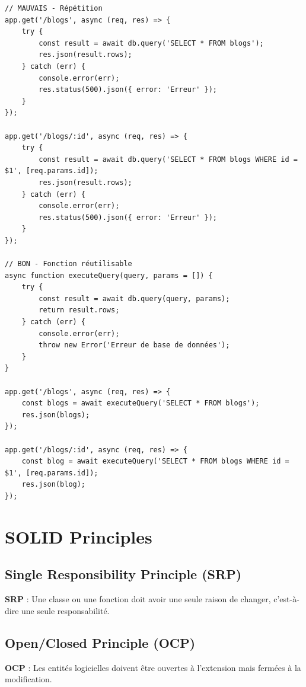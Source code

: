 \begin{lstlisting}[style=javascript, caption=Exemple DRY]
// MAUVAIS - Répétition
app.get('/blogs', async (req, res) => {
    try {
        const result = await db.query('SELECT * FROM blogs');
        res.json(result.rows);
    } catch (err) {
        console.error(err);
        res.status(500).json({ error: 'Erreur' });
    }
});

app.get('/blogs/:id', async (req, res) => {
    try {
        const result = await db.query('SELECT * FROM blogs WHERE id = $1', [req.params.id]);
        res.json(result.rows);
    } catch (err) {
        console.error(err);
        res.status(500).json({ error: 'Erreur' });
    }
});

// BON - Fonction réutilisable
async function executeQuery(query, params = []) {
    try {
        const result = await db.query(query, params);
        return result.rows;
    } catch (err) {
        console.error(err);
        throw new Error('Erreur de base de données');
    }
}

app.get('/blogs', async (req, res) => {
    const blogs = await executeQuery('SELECT * FROM blogs');
    res.json(blogs);
});

app.get('/blogs/:id', async (req, res) => {
    const blog = await executeQuery('SELECT * FROM blogs WHERE id = $1', [req.params.id]);
    res.json(blog);
});
\end{lstlisting}

\section{SOLID Principles}

\subsection{Single Responsibility Principle (SRP)}

\begin{definitionbox}
    \textbf{SRP} : Une classe ou une fonction doit avoir une seule raison de changer, c'est-à-dire une seule responsabilité.
\end{definitionbox}

\subsection{Open/Closed Principle (OCP)}

\begin{definitionbox}
    \textbf{OCP} : Les entités logicielles doivent être ouvertes à l'extension mais fermées à la modification.
\end{definitionbox}

